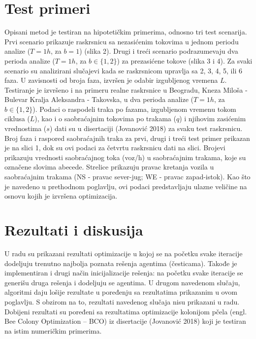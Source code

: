 \section{Test primeri}

Opisani metod je testiran na hipotetičkim primerima, odnosno tri test scenarija. Prvi scenario prikazuje raskrsnicu sa nezasićenim tokovima u jednom periodu analize ($T=1h$, za $b = 1$) (slika 2). Drugi i treći scenario podrazumevaju dva perioda analize ($T=1h$, za $b\in\{1,2\}$) za prezasićene tokove (slika 3 i 4). Za svaki scenario su analizirani slučajevi kada se raskrsnicom upravlja sa 2, 3, 4, 5, ili 6 faza. U zavisnosti od broja faza, izvršen je odabir izgubljenog vremena $L$. Testiranje je izvršeno i na primeru realne raskrsnice u Beogradu, Kneza Miloša - Bulevar Kralja Aleksandra - Takovska, u dva perioda analize  ($T=1h$, za $b\in\{1,2\}$). Podaci o raspodeli traka po fazama, izgubljenom vremenu tokom ciklusa ($L$), kao i o saobraćajnim tokovima po trakama ($q$) i njihovim zasićenim vrednostima ($s$) dati su u disertaciji (Jovanović 2018) za svaku test raskrsnicu. Broj faza i raspored saobraćajnih traka za prvi, drugi i treći test primer prikazan je na slici 1, dok su ovi podaci za četvrtu raskrsnicu dati na slici. Brojevi prikazuju vrednosti saobraćajnog toka (voz/h) u saobraćajnim trakama, koje su označene slovima abecede. Strelice prikazuju pravac kretanja vozila u saobraćajnim trakama (NS - pravac sever-jug; WE - pravac zapad-istok). Kao što je navedeno u prethodnom poglavlju, ovi podaci predstavljaju ulazne veličine na osnovu kojih je izvršena optimizacija.


\section{Rezultati i diskusija}

U radu su prikazani rezultati optimizacije u kojoj se na početku svake iteracije dodeljuju trenutno najbolja poznata rešenja agentima (česticama). Takođe je implementiran i drugi način inicijalizacije rešenja: na početku svake iteracije se generišu druga rešenja i dodeljuju se agentima. U drugom navedenom slučaju, algoritmi daju lošije rezultate u poređenju sa rezultatima prikazanim u ovom poglavlju. S obzirom na to, rezultati navedenog slučaja nisu prikazani u radu. Dobijeni rezultati su poređeni sa rezultatima optimizacije kolonijom pčela (engl. Bee Colony Optimization – BCO) iz disertacije (Jovanović 2018) koji je testiran na istim numeričkim primerima.

